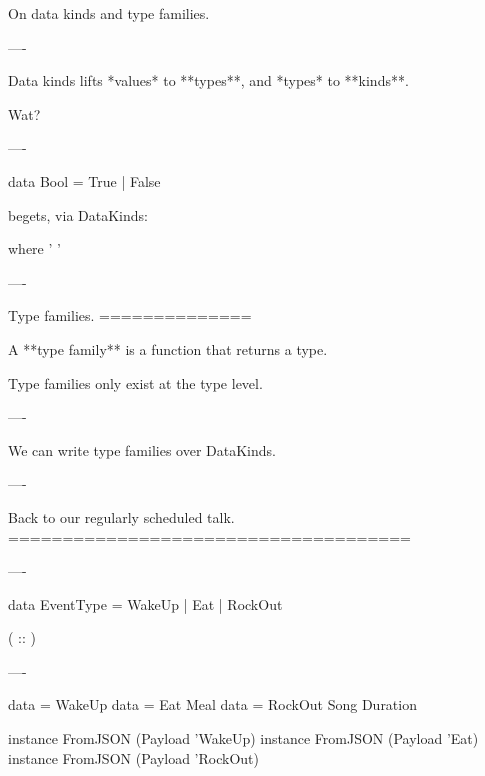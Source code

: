 On data kinds and type families.

----

Data kinds lifts *values* to **types**, and *types* to **kinds**.

Wat?

----

\begin{hs}
  data Bool = True
            | False
\end{hs}

\begin{raw}
\end{raw}


begets, via DataKinds:

\begin{custom}

    where
     '
     '
\end{custom}

----

Type families.
==============

A **type family** is a function that returns a type.

Type families only exist at the type level.

----

We can write type families over DataKinds.

----

Back to our regularly scheduled talk.
=====================================

----

\begin{hs}

  data EventType = WakeUp | Eat | RockOut
\end{hs}

\begin{custom}
    ( :: )
\end{custom}

----

\begin{raw}
  data   = WakeUp
  data      = Eat Meal
  data  = RockOut Song Duration

  instance FromJSON (Payload 'WakeUp)
  instance FromJSON (Payload 'Eat)
  instance FromJSON (Payload 'RockOut)
\end{raw}


